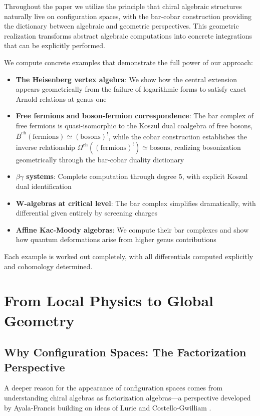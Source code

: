 Throughout the paper we utilize the principle that chiral algebraic structures naturally live on configuration spaces, with the bar-cobar construction providing the dictionary between algebraic and geometric perspectives. This geometric realization transforms abstract algebraic computations into concrete integrations that can be explicitly performed. 

We compute concrete examples that demonstrate the full power of our approach:
\begin{itemize}
\item \textbf{The Heisenberg vertex algebra}: We show how the central extension appears geometrically from the failure of logarithmic forms to satisfy exact Arnold relations at genus one
\item \textbf{Free fermions and boson-fermion correspondence}: The bar complex of free fermions is quasi-isomorphic to the Koszul dual coalgebra of free bosons, $\bar{B}^{\text{ch}}(\text{fermions}) \simeq (\text{bosons})^!$, while the cobar construction establishes the inverse relationship $\Omega^{\text{ch}}((\text{fermions})^!) \simeq \text{bosons}$, realizing bosonization geometrically through the bar-cobar duality dictionary
\item \textbf{$\beta\gamma$ systems}: Complete computation through degree 5, with explicit Koszul dual identification
\item \textbf{W-algebras at critical level}: The bar complex simplifies dramatically, with differential given entirely by screening charges
\item \textbf{Affine Kac-Moody algebras}: We compute their bar complexes and show how quantum deformations arise from higher genus contributions
\end{itemize}

Each example is worked out completely, with all differentials computed explicitly and cohomology determined.

\section{From Local Physics to Global Geometry}


\subsection{Why Configuration Spaces: The Factorization Perspective}

A deeper reason for the appearance of configuration spaces comes from understanding chiral algebras as factorization algebras—a perspective developed by Ayala-Francis \cite{AF15} building on ideas of Lurie \cite{HA} and Costello-Gwilliam \cite{CG17}. 

